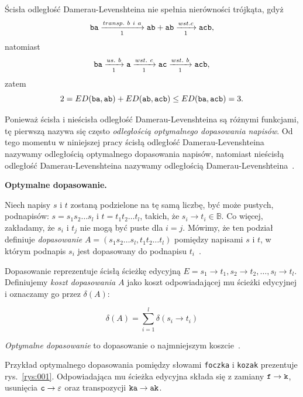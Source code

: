\documentclass{praca1}
\begin{document}
Ścisła odległość Damerau-Levenshteina nie spełnia nierówności trójkąta, gdyż
$$
\verb|ba|  \xrightarrow[1]{transp.\ b\ i \ a} \verb|ab| + \verb|ab| \xrightarrow[1]{wst. c} \verb|acb|,
$$
natomiast
$$
\verb|ba|  \xrightarrow[1]{us.\ b} \verb|a| \xrightarrow[1]{wst.\ c} \verb|ac| \xrightarrow[1]{wst.\ b} \verb|acb|,
$$
zatem
$$
2 = ED(\verb|ba|, \verb|ab|) + ED(\verb|ab|, \verb|acb|) \leq ED(\verb|ba|, \verb|acb|) = 3.
$$

Ponieważ ścisła i nieścisła odległość Damerau-Levenshteina są różnymi funkcjami, tę pierwszą nazywa się często \emph{odległością optymalnego dopasowania napisów}. Od tego momentu w niniejszej pracy ścisłą odległość Damerau-Levenshteina nazywamy odległością optymalnego dopasowania napisów, natomiast nieścisłą odległość Damerau-Levenshteina nazywamy odległością Damerau-Levenshteina~\cite{Loo2014:stringdist}.

\textbf{Optymalne dopasowanie.} %

\begin{definition}
Niech napisy $s$ i $t$ zostaną podzielone na tę samą liczbę, być może pustych, podnapisów: $s = s_1 s_2 \ldots s_l$ i $t = t_1 t_2 \ldots t_l$, takich, że $s_i \rightarrow t_i \in \mathbb{B}$. Co więcej, zakładamy, że $s_i$ i $t_j$ nie mogą być puste dla $i = j$. Mówimy, że ten podział definiuje \emph{dopasowanie} $A = (s_1 s_2\ldots s_l, t_1 t_2 \ldots t_l)$ pomiędzy napisami $s$ i $t$, w którym podnapis $s_i$ jest dopasowany do podnapisu $t_i$~\cite{Boytsov2011:indexingmethods}.
\end{definition}

Dopasowanie reprezentuje ścisłą ścieżkę edycyjną $E = s_1 \rightarrow t_1, s_2 \rightarrow t_2, \ldots, s_l \rightarrow t_l$. Definiujemy \emph{koszt dopasowania} $A$ jako koszt odpowiadającej mu ścieżki edycyjnej i oznaczamy go przez $\delta(A)$:

\begin{equation}
\label{eq:003}
\delta(A) = \sum\limits_{i = 1}^{l} \delta(s_i \rightarrow t_i)
\end{equation}

\emph{Optymalne dopasowanie} to dopasowanie o najmniejszym koszcie~\cite{Boytsov2011:indexingmethods}.


\begin{example}
Przykład optymalnego dopasowania pomiędzy słowami \verb|foczka| i \verb|kozak| prezentuje rys.~\ref{rys:001}. Odpowiadająca mu ścieżka edycyjna składa się z zamiany $\verb|f| \rightarrow \verb|k|$, usunięcia $\verb|c| \rightarrow \varepsilon$ oraz transpozycji $\verb|ka| \rightarrow \verb|ak|$.
\end{example}
\end{document}
